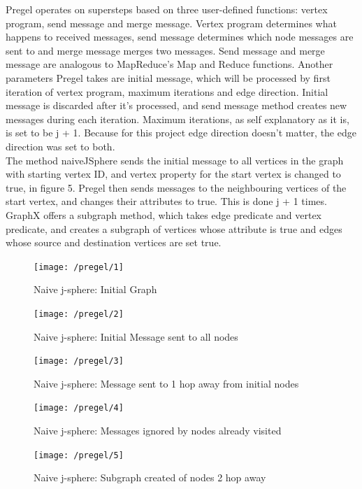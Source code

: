 \documentclass{article}
\theoremstyle{definition}
\begin{document}
Pregel operates on supersteps based on three user-defined functions: vertex program, send message and merge message. Vertex program determines what happens to received messages, send message determines which node messages are sent to and merge message merges two messages. Send message and merge message are analogous to MapReduce's Map and Reduce functions. Another parameters Pregel takes are initial message, which will be processed by first iteration of vertex program, maximum iterations and edge direction. Initial message is discarded after it's processed, and send message method creates new messages during each iteration. Maximum iterations, as self explanatory as it is, is set to be j + 1. Because for this project edge direction doesn't matter, the edge direction was set to both. \\

The method naiveJSphere sends the initial message to all vertices in the graph with starting vertex ID, and vertex property for the start vertex is changed to true, in figure 5. Pregel then sends messages to the neighbouring vertices of the start vertex, and changes their attributes to true. This is done j + 1 times. GraphX offers a subgraph method, which takes edge predicate and vertex predicate, and creates a subgraph of vertices whose attribute is true and edges whose source and destination vertices are set true. 

\begin{figure}[H]
\centering
\texttt{[image: /pregel/1]}
\caption{Naive j-sphere: Initial Graph}
\end{figure}

\begin{figure}[H]
\centering
\texttt{[image: /pregel/2]}
\caption{Naive j-sphere: Initial Message sent to all nodes}
\end{figure}

\begin{figure}[H]
\centering
\texttt{[image: /pregel/3]}
\caption{Naive j-sphere: Message sent to 1 hop away from initial nodes}
\end{figure}

\begin{figure}[H]
\centering
\texttt{[image: /pregel/4]}
\caption{Naive j-sphere: Messages ignored by nodes already visited}
\end{figure}

\begin{figure}[H]
\centering
\texttt{[image: /pregel/5]}
\caption{Naive j-sphere: Subgraph created of nodes 2 hop away}
\end{figure}
\end{document}
